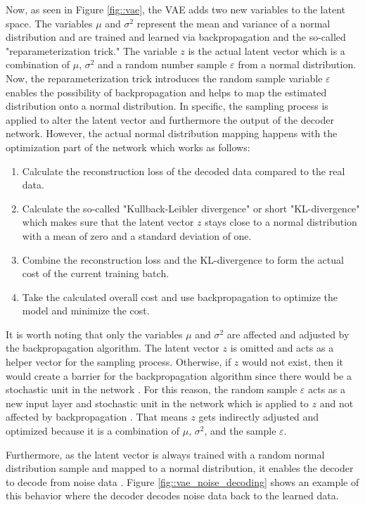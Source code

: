 \documentclass[MGS,Master,english]{twbook}%
\begin{document}
Now, as seen in Figure \ref{fig::vae}, the VAE adds two new variables to the latent space. The variables $\mu$ and $\sigma^{2}$ represent the mean and variance of a normal distribution and are trained and learned via backpropagation and the so-called "reparameterization trick." The variable $z$ is the actual latent vector which is a combination of $\mu$, $\sigma^{2}$ and a random number sample $\varepsilon$ from a normal distribution. Now, the reparameterization trick introduces the random sample variable $\varepsilon$ enables the possibility of backpropagation and helps to map the estimated distribution onto a normal distribution. In specific, the sampling process is applied to alter the latent vector and furthermore the output of the decoder network. However, the actual normal distribution mapping happens with the optimization part of the network which works as follows:
\begin{enumerate}
	\item Calculate the reconstruction loss of the decoded data compared to the real data.
	\item Calculate the so-called "Kullback-Leibler divergence" or short "KL-divergence" which makes sure that the latent vector $z$ stays close to a normal distribution with a mean of zero and a standard deviation of one.
	\item Combine the reconstruction loss and the KL-divergence to form the actual cost of the current training batch.
	\item Take the calculated overall cost and use backpropagation to optimize the model and minimize the cost.
\end{enumerate}

It is worth noting that only the variables $\mu$ and $\sigma^{2}$ are affected and adjusted by the backpropagation algorithm. The latent vector $z$ is omitted and acts as a helper vector for the sampling process. Otherwise, if $z$ would not exist, then it would create a barrier for the backpropagation algorithm since there would be a stochastic unit in the network \cite{ml::vae::tutorial}. For this reason, the random sample $\varepsilon$ acts as a new input layer and stochastic unit in the network which is applied to $z$ and not affected by backpropagation \cite{ml::vae::tutorial}. That means $z$ gets indirectly adjusted and optimized because it is a combination of $\mu$, $\sigma^{2}$, and the sample $\varepsilon$.

Furthermore, as the latent vector is always trained with a random normal distribution sample and mapped to a normal distribution, it enables the decoder to decode from noise data \cite{ml::vae::tutorial}. Figure \ref{fig::vae_noise_decoding} shows an example of this behavior where the decoder decodes noise data back to the learned data. 
\end{document}
